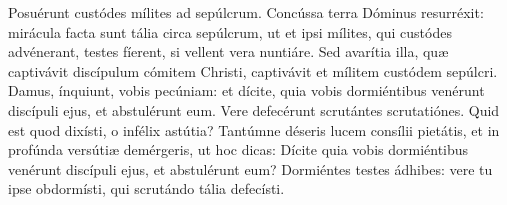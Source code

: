 
 \lesson

 Posuérunt custódes mílites ad sepúlcrum. Concússa terra Dóminus resurréxit:
 mirácula facta sunt tália circa sepúlcrum, ut et ipsi mílites, qui custódes
 advénerant, testes fíerent, si vellent vera nuntiáre. Sed avarítia illa, quæ
 captivávit discípulum cómitem Christi, captivávit et mílitem custódem
 sepúlcri. Damus, ínquiunt, vobis pecúniam: et dícite, quia vobis dormiéntibus
 venérunt discípuli ejus, et abstulérunt eum. Vere defecérunt scrutántes
 scrutatiónes. Quid est quod dixísti, o infélix astútia? Tantúmne déseris lucem
 consílii pietátis, et in profúnda versútiæ demérgeris, ut hoc dicas: Dícite
 quia vobis dormiéntibus venérunt discípuli ejus, et abstulérunt eum?
 Dormiéntes testes ádhibes: vere tu ipse obdormísti, qui scrutándo tália
 defecísti.

